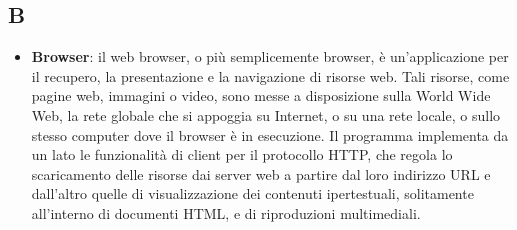\subsection{B}
\begin{itemize} 
	\item
	\textbf{Browser}: il web browser, o più semplicemente browser, è un'applicazione per il recupero, la presentazione e la navigazione di risorse web. Tali risorse, come pagine web, immagini o video, sono messe a disposizione sulla World Wide Web, la rete globale che si appoggia su Internet, o su una rete locale, o sullo stesso computer dove il browser è in esecuzione. Il programma implementa da un lato le funzionalità di client per il protocollo HTTP, che regola lo scaricamento delle risorse dai server web a partire dal loro indirizzo URL e dall'altro quelle di visualizzazione dei contenuti ipertestuali, solitamente all'interno di documenti HTML, e di riproduzioni multimediali.
\end{itemize}